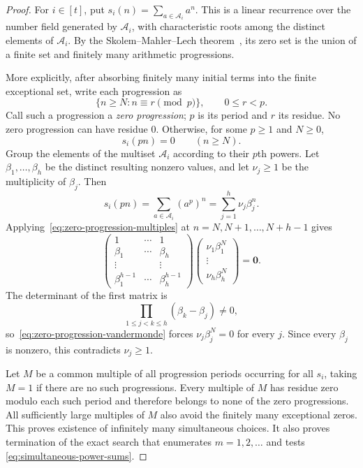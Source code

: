 \documentclass[11pt]{article}
\theoremstyle{plain}
\theoremstyle{definition}
\theoremstyle{remark}
\begin{document}
\begin{proof}
For $i\in[t]$, put $s_i(n)=\sum_{a\in\mathcal A_i}a^n$.  This is a linear
recurrence over the number field generated by $\mathcal A_i$, with
characteristic roots among the distinct elements of $\mathcal A_i$.  By the
Skolem--Mahler--Lech theorem~\cite{Lech1953}, its zero set is the union of a
finite set and finitely many arithmetic progressions.

More explicitly, after absorbing finitely many initial terms into the finite
exceptional set, write each progression as
\[
  \{n\ge N:n\equiv r\pmod p\},
  \qquad 0\le r<p.
\]
Call such a progression a \emph{zero progression}; $p$ is its period and
$r$ its residue.  No zero progression can have residue $0$.  Otherwise, for
some $p\ge1$ and $N\ge0$,
\begin{equation}
  s_i(pn)=0
  \qquad(n\ge N).
  \label{eq:zero-progression-multiples}
\end{equation}
Group the elements of the multiset $\mathcal A_i$ according to their $p$th
powers.  Let $\beta_1,\ldots,\beta_h$ be the distinct resulting nonzero
values, and let $\nu_j\ge1$ be the multiplicity of $\beta_j$.  Then
\[
  s_i(pn)
  =\sum_{a\in\mathcal A_i}(a^p)^n
  =\sum_{j=1}^h\nu_j\beta_j^n.
\]
Applying~\eqref{eq:zero-progression-multiples} at
$n=N,N+1,\ldots,N+h-1$ gives
\begin{equation}
  \begin{pmatrix}
    1&\cdots&1\\
    \beta_1&\cdots&\beta_h\\
    \vdots&&\vdots\\
    \beta_1^{h-1}&\cdots&\beta_h^{h-1}
  \end{pmatrix}
  \begin{pmatrix}
    \nu_1\beta_1^N\\
    \vdots\\
    \nu_h\beta_h^N
  \end{pmatrix}
  =\mathbf0.
  \label{eq:zero-progression-vandermonde}
\end{equation}
The determinant of the first matrix is
\[
  \prod_{1\le j<k\le h}(\beta_k-\beta_j)\ne0,
\]
so~\eqref{eq:zero-progression-vandermonde} forces
$\nu_j\beta_j^N=0$ for every $j$.  Since every $\beta_j$ is nonzero, this
contradicts $\nu_j\ge1$.

Let $M$ be a common multiple of all progression periods occurring for all
$s_i$, taking $M=1$ if there are no such progressions.  Every multiple of
$M$ has residue zero modulo each such period and
therefore belongs to none of the zero progressions.  All sufficiently large
multiples of $M$ also avoid the finitely many exceptional zeros.  This proves
existence of infinitely many simultaneous choices.  It also proves
termination of the exact search that enumerates $m=1,2,\ldots$ and tests
\eqref{eq:simultaneous-power-sums}.
\end{proof}
\end{document}
